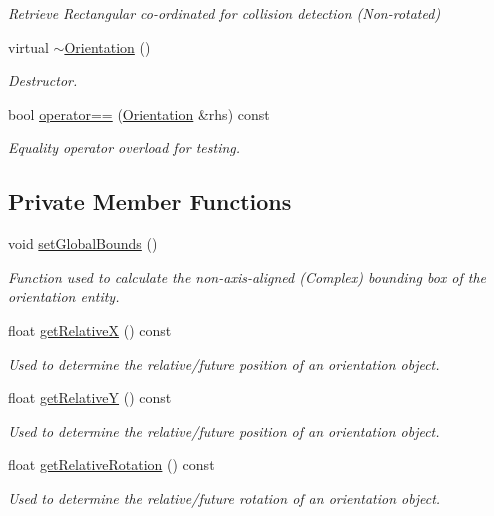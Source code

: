 \begin{DoxyCompactItemize}
\begin{DoxyCompactList}\small\item\em Retrieve Rectangular co-\/ordinated for collision detection (Non-\/rotated) \end{DoxyCompactList}\item 
virtual \hyperlink{classOrientation_a8c96df6f0b3b9a9edc7f9a0a9cc10741}{$\sim$\-Orientation} ()
\begin{DoxyCompactList}\small\item\em Destructor. \end{DoxyCompactList}\item 
bool \hyperlink{classOrientation_a0195b81c78baadd074301bc019d11db8}{operator==} (\hyperlink{classOrientation}{Orientation} \&rhs) const 
\begin{DoxyCompactList}\small\item\em Equality operator overload for testing. \end{DoxyCompactList}\end{DoxyCompactItemize}
\subsection*{Private Member Functions}
\begin{DoxyCompactItemize}
\item 
void \hyperlink{classOrientation_aa1a923fcae4e94c8bbd319b094732d43}{set\-Global\-Bounds} ()
\begin{DoxyCompactList}\small\item\em Function used to calculate the non-\/axis-\/aligned (Complex) bounding box of the orientation entity. \end{DoxyCompactList}\item 
float \hyperlink{classOrientation_aadef2c8638c11919def962831d10934c}{get\-Relative\-X} () const 
\begin{DoxyCompactList}\small\item\em Used to determine the relative/future position of an orientation object. \end{DoxyCompactList}\item 
float \hyperlink{classOrientation_a9230d58e08959c61a26876769e9b6df0}{get\-Relative\-Y} () const 
\begin{DoxyCompactList}\small\item\em Used to determine the relative/future position of an orientation object. \end{DoxyCompactList}\item 
float \hyperlink{classOrientation_a3909302fb7aea90a0bc706871f0a072f}{get\-Relative\-Rotation} () const 
\begin{DoxyCompactList}\small\item\em Used to determine the relative/future rotation of an orientation object. \end{DoxyCompactList}\end{DoxyCompactItemize}
